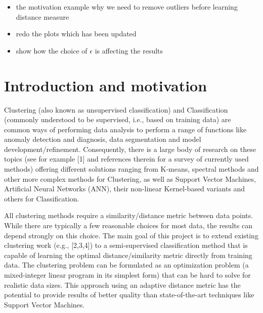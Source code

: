 \documentclass[]{article}
\begin{document}
\begin{itemize}
\item the motivation example why we need to remove outliers before learning distance measure

\item redo the plots which has been updated

\item show how the choice of $\epsilon$ is affecting the results

\end{itemize}















\section{Introduction and motivation}

Clustering (also known as unsupervised classification) and Classification (commonly understood to be supervised, i.e., based on training data) are common ways of performing data analysis to perform a range of functions like anomaly detection and diagnosis, data segmentation and model development/refinement. Consequently, there is a large body of research on these topics (see for example [1] and references therein for a survey of currently used methods) offering different solutions ranging from K-means, spectral methods and other more complex methods for Clustering, as well as Support Vector Machines, Artificial Neural Networks (ANN), their non-linear Kernel-based variants and others for Classification.

All clustering methods require a similarity/distance metric between data points. While there are typically a few reasonable choices for most data, the results can depend strongly on this choice. The main goal of this project is to extend existing clustering work (e.g., [2,3,4]) to a semi-supervised classification method that is capable of learning the optimal distance/similarity metric directly from training data. The clustering problem can be formulated as an optimization problem (a mixed-integer linear program in its simplest form) that can be hard to solve for realistic data sizes. This approach using an adaptive distance metric has the potential to provide results of better quality than state-of-the-art techniques like Support Vector Machines.  
\end{document}
